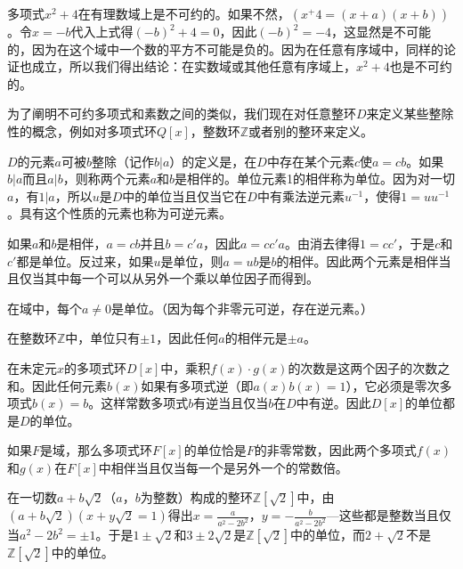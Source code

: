 多项式$x^2+4$在有理数域上是不可约的。如果不然，$(x^+4 = (x+a)(x+b))$。令$x=-b$代入上式得$(-b)^2+4 = 0$，因此$(-b)^2=-4$，这显然是不可能的，因为在这个域中一个数的平方不可能是负的。因为在任意有序域中，同样的论证也成立，所以我们得出结论：在实数域或其他任意有序域上，$x^2+4$也是不可约的。

为了阐明不可约多项式和素数之间的类似，我们现在对任意整环$D$来定义某些整除性的概念，例如对多项式环$Q[x]$，整数环$\mathbb{Z}$或者别的整环来定义。

$D$的元素$a$可被$b$整除（记作$b|a$）的定义是，在$D$中存在某个元素$c$使$a = cb$。如果$b|a$而且$a|b$，则称两个元素$a$和$b$是相伴的。单位元素1的相伴称为单位。因为对一切$a$，有$1|a$，所以$u$是$D$中的单位当且仅当它在$D$中有乘法逆元素$u^{-1}$，使得$1=uu^{-1}$。具有这个性质的元素也称为可逆元素。

如果$a$和$b$是相伴，$a=cb$并且$b=c'a$，因此$a=cc'a$。由消去律得$1=cc'$，于是$c$和$c'$都是单位。反过来，如果$u$是单位，则$a=ub$是$b$的相伴。因此两个元素是相伴当且仅当其中每一个可以从另外一个乘以单位因子而得到。

\begin{example}\label{exam001030601}
在域中，每个$a \neq 0$是单位。（因为每个非零元可逆，存在逆元素。）
\end{example}

\begin{example}\label{exam001030602}
在整数环$\mathbb{Z}$中，单位只有$\pm{1}$，因此任何$a$的相伴元是$\pm{a}$。
\end{example}

\begin{example}\label{exam001030603}
在未定元$x$的多项式环$D[x]$中，乘积$f(x) \cdot g(x)$的次数是这两个因子的次数之和。因此任何元素$b(x)$如果有多项式逆（即$a(x)b(x)=1$），它必须是零次多项式$b(x)=b$。这样常数多项式$b$有逆当且仅当$b$在$D$中有逆。因此$D[x]$的单位都是$D$的单位。

如果$F$是域，那么多项式环$F[x]$的单位恰是$F$的非零常数，因此两个多项式$f(x)$和$g(x)$在$F[x]$中相伴当且仅当每一个是另外一个的常数倍。
\end{example}

\begin{example}\label{exam001030604}
在一切数$a + b\sqrt{2}$（$a$，$b$为整数）构成的整环$\mathbb{Z}[\sqrt{2}]$中，由$(a+b\sqrt{2})(x+y\sqrt{2}=1)$得出$x = \frac{a}{a^2-2b^2}$，$y = -\frac{b}{a^2-2b^2}$---这些都是整数当且仅当$a^2-2b^2=\pm{1}$。于是$1\pm{}\sqrt{2}$和$3 \pm 2\sqrt{2}$是$\mathbb{Z}[\sqrt{2}]$中的单位，而$2 + \sqrt{2}$不是$\mathbb{Z}[\sqrt{2}]$中的单位。
\end{example}

